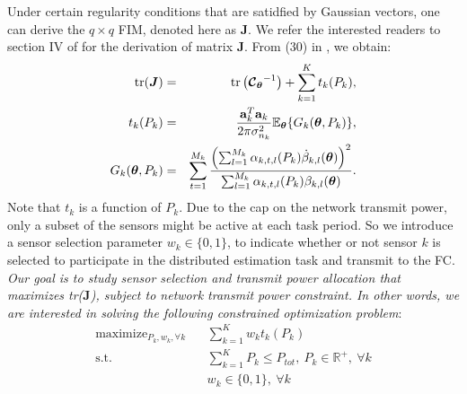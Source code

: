 \documentclass[conference]{IEEEtran}
\begin{document}
Under certain regularity conditions that are satidfied by Gaussian vectors, one can derive the $q\times q$ FIM, denoted here as $\boldsymbol{J}$. We refer the interested readers to section IV of \cite{Shirazi_Vosoughi_journal_2017} for the derivation of matrix $\boldsymbol{J}$. From (30) in \cite{Shirazi_Vosoughi_journal_2017}, we obtain:
%
\begin{eqnarray} \label{trace of J}
\text{tr}(\boldsymbol{J})&=&\text{tr}\left({\boldsymbol{\cal C}_{\boldsymbol{\theta}}}^{-1}\right)+\sum_{k=1}^{K}t_k(P_k),\\
t_k(P_k)&=&\frac{\mathbf{a}_k^T\mathbf{a}_k}{2\pi\sigma_{n_k}^2}\mathbb{E}_{\boldsymbol{\theta}}\{G_k(\boldsymbol{\theta},P_k)\},\nonumber\\
G_k(\boldsymbol{\theta},P_k)&=&\sum_{t=1}^{M_k}\frac{\left(\sum_{l=1}^{M_k}\alpha_{k,t,l}(P_k)\dot{\beta}_{k,l}
(\boldsymbol{\theta})\right)^2}{\sum_{l=1}^{M_k}\alpha_{k,t,l}(P_k)\beta_{k,l}(\boldsymbol{\theta})}.\nonumber 
\end{eqnarray}
%
Note that $t_k$ is a function of $P_k$. Due to the cap on the network transmit power,
only a subset of the sensors might be active at each task
period. So we introduce a sensor selection parameter $w_k\in\{0,1\}$, to indicate whether or not sensor $k$ is selected to participate in the distributed estimation task and transmit to the FC. {\it Our goal is to study sensor selection and transmit power allocation that maximizes tr($\boldsymbol{J}$), subject to network transmit power constraint. In other words, we are interested in solving the following constrained optimization problem}:
%
\begin{subequations}
\begin{align*} \tag{P1}\label{power aloc sen selection problem}
\mathop{\text{maximize}}_{P_k, w_k, \forall k}\ \ \ \ &\sum_{k=1}^{K}w_kt_k(P_k)\nonumber\\
\text{s.t.}\ \ \ \ &\sum_{k=1}^{K}P_k\leq P_{tot},\ P_k\in \mathbb{R}^{+},\ \forall k\\
&w_k\in \{0,1\},\ \forall k
\end{align*}
\end{subequations}
%
\begin{comment}
%
\begin{align*} \tag{P0}\label{maximization problem of tr(J)}
\mathop{\text{maximize}}_{P_k,\forall k}\ \ \ \ &\text{tr}\left(\boldsymbol{J}\left(\{P_k\}_{k=1}^K\right)\right)\nonumber\\
\text{s.t.}\ \ \ \ &\sum_{k=1}^{K}P_k\leq P_{tot},\ P_k\in \mathbb{R}^{+},\ \forall k
\end{align*}
% 
In subsection VI-A of \cite{Shirazi_Vosoughi_journal_2017}, we argued that this problem is concave, and therefore, its global solution can be found using Newton's method. In the following section, we propose different methods to address this problem, and finally compare their results.
\end{comment}  
\end{document}
